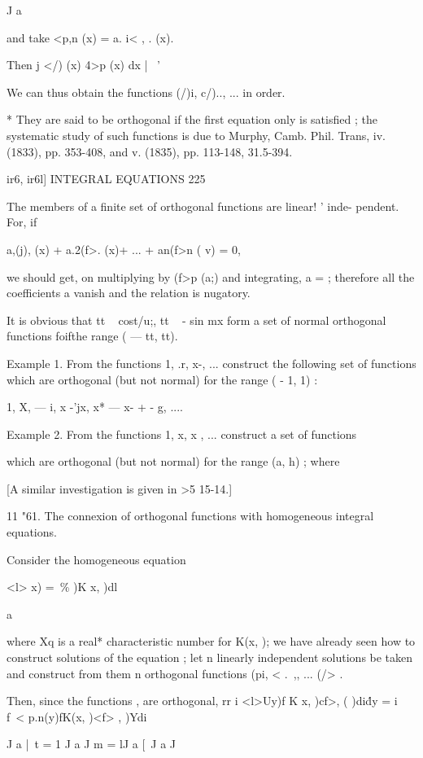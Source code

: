 {J a

and take <p,n (x) = a. i< , . (x).

Then j </) (x) 4>p (x) dx |~ '

We can thus obtain the functions (/)i, c/).., ... in order.

* They are said to be orthogonal if the first equation only is
satisfied ; the systematic study of such functions is due to Murphy,
Camb. Phil. Trans, iv. (1833), pp. 353-408, and v. (1835), pp.
113-148, 31.5-394.



ir6, ir6l] INTEGRAL EQUATIONS 225

The members of a finite set of orthogonal functions are linear! '
inde- pendent. For, if

a,(j), (x) + a.2(f>. (x)+ ... + an(f>n ( v) = 0,

we should get, on multiplying by (f>p (a;) and integrating, a = ;
therefore all the coefficients a vanish and the relation is nugatory.

It is obvious that tt ~ cost/u;, tt ~ - sin mx form a set of normal
orthogonal functions foifthe range ( — tt, tt).

Example 1. From the functions 1, .r, x-, ... construct the following
set of functions which are orthogonal (but not normal) for the range (
- 1, 1) :

1, X, — i, x -'jx, x* — x- + - g, ....

Example 2. From the functions 1, x, x , ... construct a set of
functions

which are orthogonal (but not normal) for the range (a, h) ; where

[A similar investigation is given in >5 15-14.]

11 "61. The connexion of orthogonal functions with homogeneous
integral equations.

Consider the homogeneous equation

<l> x) = \,\% )K x, )dl

  a

where Xq is a real* characteristic number for K(x, ); we have already
seen how to construct solutions of the equation ; let n linearly
independent solutions be taken and construct from them n orthogonal
functions (pi, < .\ ,, ... (/> .

Then, since the functions , are orthogonal, rr i <l>Uy)f K x, )cf>, (
)di\'dy = i f\ < p.n(y)fK(x, )<f> , )Ydi

J a |\ t = 1 J a J m = lJ a [\ J a J

}
